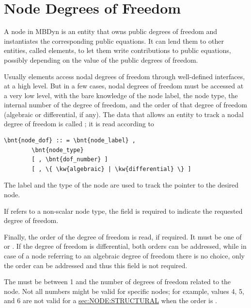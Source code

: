 \section{Node Degrees of Freedom}\label{sec:NodeDof}
A node in MBDyn is an entity that owns public degrees of freedom
and instantiates the corresponding public equations.
It can lend them to other entities, called elements, to let them write
contributions to public equations, possibly depending on the value
of the public degrees of freedom. 

Usually elements access nodal degrees of freedom through well-defined
interfaces, at a high level. 
But in a few cases, nodal degrees of freedom must be accessed
at a very low level, with the bare knowledge of the node label,
the node type, the internal number of the degree of freedom,
and the order of that degree of freedom (algebraic or differential, if any).
The data that allows an entity to track a nodal degree of freedom
is called ; it is read according to
\begin{Verbatim}[commandchars=\\\{\}]
    \bnt{node_dof} :: = \bnt{node_label} , 
        \bnt{node_type}
        [ , \bnt{dof_number} ]
        [ , \{ \kw{algebraic} | \kw{differential} \} ]
\end{Verbatim}
The label  and the type 
of the node are used to track the pointer to the desired node. 

If  refers to a non-scalar node type,
the  field is required to indicate the requested
degree of freedom.

Finally, the order of the degree of freedom is read, if required.
It must be one of  or .
If the  degree of freedom is differential, both
orders can be addressed, while in case of a node referring
to an algebraic degree of freedom there is no choice,
only the  order can be addressed and thus this field
is not required.

The  must be between 1 and the number of degrees of freedom
related to the node.
Not all numbers might be valid for specific nodes; for example,
 values 4, 5, and 6 are not valid for a
\hyperref{\kw{structural node}}{\kw{structural node}, Section~}{}{sec:NODE:STRUCTURAL} when the order is .

